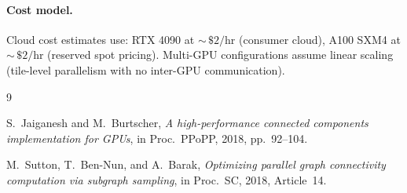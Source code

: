 \documentclass[11pt,a4paper]{article}
\theoremstyle{definition}
\theoremstyle{plain}
\theoremstyle{remark}
\begin{document}
\paragraph{Cost model.}
Cloud cost estimates use: RTX 4090 at ${\sim}\,\$2/\text{hr}$ (consumer cloud), A100 SXM4 at ${\sim}\,\$2/\text{hr}$ (reserved spot pricing).  Multi-GPU configurations assume linear scaling (tile-level parallelism with no inter-GPU communication).

\begin{thebibliography}{9}

S.~Jaiganesh and M.~Burtscher,
\emph{A high-performance connected components implementation for GPUs},
in Proc.\ PPoPP, 2018, pp.~92--104.

M.~Sutton, T.~Ben-Nun, and A.~Barak,
\emph{Optimizing parallel graph connectivity computation via subgraph sampling},
in Proc.\ SC, 2018, Article~14.

\end{thebibliography}
\end{document}
